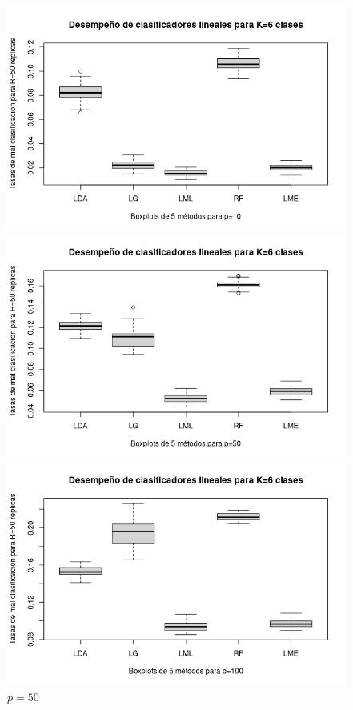\documentclass{report}
\begin{document}
  
  \begin{figure} [h]
  	\begin{multicols}{2}
  		\includegraphics[width=\linewidth]{6_clases_p10_sigma_II}\par 
  		\caption*{$p=10$}
  		\includegraphics[width=\linewidth]{6_clases_p50_sigma_II}\par 
  		\caption*{$p=50$}	 
  	\end{multicols}
  	\begin{multicols}{2}
  		\includegraphics[width=\linewidth]{6_clases_p100_sigma_II}\par

\end{multicols}
\end{figure}
\end{document}
